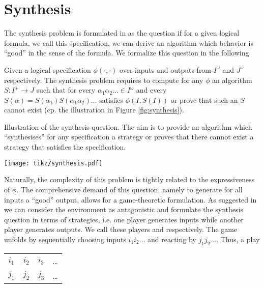 \chapter{Synthesis}
\label{chapter:synthesis}
The synthesis problem is formulated in \cite{Church} as the question if for a 
given logical formula, we call this specification, we can derive an algorithm
which behavior is \enquote{good} in the sense of the formula. We formalize this
question in the following
\begin{definition}
  Given a logical specification  $\phi(\cdot, \cdot)$ over inputs and
  outputs from $I^{\omega}$ and $J^{\omega}$ respectively. The synthesis
  problem requires to compute for any $\phi$ an algorithm
  $S:I^{+}\rightarrow J$ such that for every
  $\alpha_{1}\alpha_{2}\dots\in I^{\omega}$ and every
  $S(\alpha) = S(\alpha_{1})S(\alpha_{1}\alpha_{2})\dots$ satisfies
  $\phi(I, S(I))$ or prove that such an $S$ cannot exist (cp. the
  illustration in Figure \ref{fig:synthesis}).
\end{definition}
\begin{drawing}
  \caption{Illustration of the synthesis question. The aim is to provide an 
  algorithm which \enquote{synthesises} for any specification a strategy or 
  proves that there cannot exist a strategy that satisfies the specification.}
  \label{fig:synthesis}
  \begin{center}
    \texttt{[image: tikz/synthesis.pdf]}
  \end{center}
\end{drawing}
Naturally, the complexity of this problem is tightly related to the 
expressiveness of $\phi$. The comprehensive demand of this question, namely
to generate for all inputs a \enquote{good} output, allows for a
game-theoretic formulation. As suggested in \cite{SeqCondStrat} we can consider
the environment as antagonistic and formulate the synthesis question in terms
of strategies, i.e. one player generates inputs while another player generates
outputs. We call these players  and \outputp{} respectively. The game
unfolds by  sequentially choosing inputs $i_{1}i_{2}\dots$ and 
\outputp{} reacting by $j_{1}j_{2}\dots$. Thus, a play
\begin{center}
  \begin{tabular}{cccc}
    $i_{1}$ & $i_{2}$ & $i_{3}$ & \dots\\
    $j_{1}$ & $j_{2}$ & $j_{3}$ & \dots
  \end{tabular}
\end{center}
